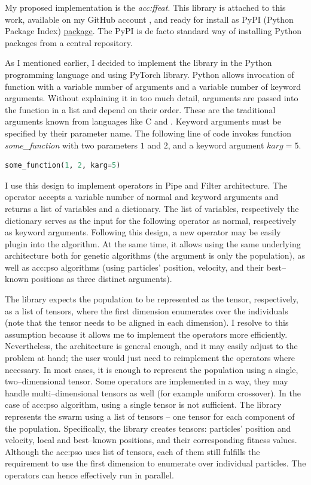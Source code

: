 My proposed implementation is the \emph{\acrfull{acc:ffeat}}. This library is attached to this work, available on my GitHub account \citep{FFEATrepo}, and ready for install as PyPI (Python Package Index) \href{https://pypi.org/project/FFEAT/}{package}. The PyPI is de facto standard way of installing Python packages from a central repository.

As I mentioned earlier, I decided to implement the library in the Python programming language and using PyTorch library. Python allows invocation of function with a variable number of arguments and a variable number of keyword arguments. Without explaining it in too much detail, arguments are passed into the function in a list and depend on their order. These are the traditional arguments known from languages like C and \cppns. Keyword arguments must be specified by their parameter name. The following line of code invokes function \textit{some\_function} with two parameters $1$ and $2$, and a keyword argument $karg=5$.

\begin{lstlisting}[language=Python]
some_function(1, 2, karg=5)
\end{lstlisting}

I use this design to implement operators in Pipe and Filter architecture. The operator accepts a variable number of normal and keyword arguments and returns a list of variables and a dictionary. The list of variables, respectively the dictionary serves as the input for the following operator as normal, respectively as keyword arguments. Following this design, a new operator may be easily plug\-in into the algorithm. At the same time, it allows using the same underlying architecture both for genetic algorithms (the argument is only the population), as well as \acrshort{acc:pso} algorithms (using particles' position, velocity, and their best--known positions as three distinct arguments).

The library expects the population to be represented as the tensor, respectively, as a list of tensors, where the first dimension enumerates over the individuals (note that the tensor needs to be aligned in each dimension). I resolve to this assumption because it allows me to implement the operators more efficiently. Nevertheless, the architecture is general enough, and it may easily adjust to the problem at hand; the user would just need to reimplement the operators where necessary. In most cases, it is enough to represent the population using a single, two--dimensional tensor. Some operators are implemented in a way, they may handle multi--dimensional tensors as well (for example uniform crossover). In the case of \acrshort{acc:pso} algorithm, using a single tensor is not sufficient. The library represents the swarm using a list of tensors -- one tensor for each component of the population. Specifically, the library creates tensors: particles' position and velocity, local and best--known positions, and their corresponding fitness values. Although the \acrshort{acc:pso} uses list of tensors, each of them still fulfills the requirement to use the first dimension to enumerate over individual particles. The operators can hence effectively run in parallel.

